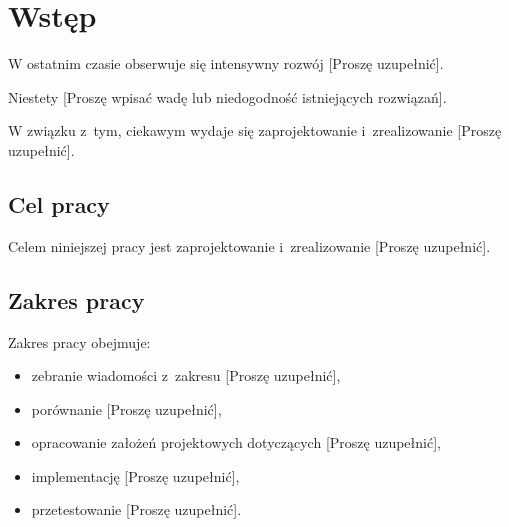 \cleardoublepage %
\chapter*{Wstęp}


W ostatnim czasie obserwuje się intensywny rozwój [Proszę uzupełnić].

Niestety [Proszę wpisać wadę lub niedogodność istniejących rozwiązań].

W związku z~tym, ciekawym wydaje się zaprojektowanie i~zrealizowanie [Proszę uzupełnić].

\section*{Cel pracy}


Celem niniejszej pracy jest zaprojektowanie i~zrealizowanie [Proszę uzupełnić].

\section*{Zakres pracy}

Zakres pracy obejmuje:

\begin{itemize}
\item zebranie wiadomości z~zakresu [Proszę uzupełnić],

\item porównanie [Proszę uzupełnić],

\item opracowanie założeń projektowych dotyczących [Proszę uzupełnić],

\item implementację [Proszę uzupełnić],

\item przetestowanie [Proszę uzupełnić].
\end{itemize}

